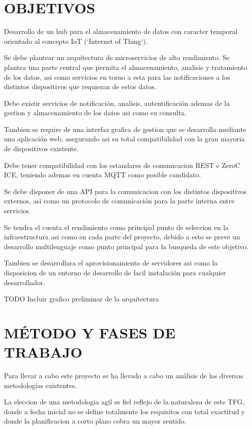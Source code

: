 \documentclass{pre-tfg}
\begin{document}
\section{OBJETIVOS}

Desarrollo de un hub para el almacenamiento de datos con caracter
temporal orientado al concepto IoT (`Internet of Thing`).

Se debe plantear un arquitectura de microservicios de alto
rendimiento. Se plantea una parte central que permita el
almacenamiento, analisis y tratamiento de los datos, asi como
servicios en torno a esta para las notificaciones a los distintos dispositivos que requieran de estos datos.

Debe existir servicios de notificación, analisis, autentificación
ademas de la gestion y almacenamiento de los datos asi como su consulta.

Tambien se require de una interfaz grafica de gestion que se desarrolla
mediante una aplicación web, asegurando asi su total compatibilidad
con la gran mayoria de dispositivos existente.

Debe tener compatibilidad con los estandares de comunicacion REST e
ZeroC ICE, teniendo ademas en cuenta MQTT como posible candidato.

Se debe disponer de una API para la comunicacion con los distintos
dispositivos externos, asi como un protocolo de comunicación para la
parte interna entre servicios.

Se tendra el cuenta el rendimiento como principal punto de seleccion
en la infraestructura asi como en cada parte del proyecto, debido a
esto se preve un desarrollo multilenguaje como punto principal para la
busqueda de este objetivo.

Tambien se desarrollara el aprovisionamiento de servidores asi como la
disposicion de un entorno de desarrollo de facil instalación para
cualquier desarrollador.

TODO Incluir grafico preliminar de la arquitectura

\section{MÉTODO Y FASES DE TRABAJO}
Para llevar a cabo este proyecto se ha llevado a cabo un análisis de
las diversas metodologías existentes.

La eleccion de una metodologia agil es fiel reflejo de la naturaleza
de este TFG, donde a fecha inicial no se define totalmente los
requisitos con total exactitud y donde la planificacion a corto plazo
cobra un mayor sentido.
\end{document}
